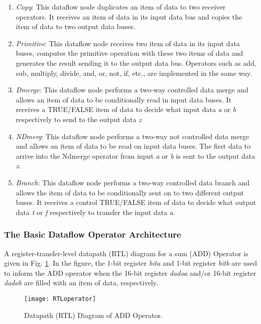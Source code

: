\documentclass[preprint,12pt]{elsarticle}
\begin{document}
\begin{enumerate}
  \item {\it Copy}: This dataflow node duplicates an item of data to two receiver operators. It receives an item of data in its input data bus and copies the item of data to two output data buses.
  \item {\it Primitive}: This dataflow node receives two item of data in its input data buses, computes the primitive operation with these two items of data and generates the result sending it to the output data bus. Operators such as add, sub, multiply, divide, and, or, not, if, etc., are implemented in the same way.
  \item {\it Dmerge}: This dataflow node performs a two-way controlled data merge and allows an item of data to be conditionally read in input data buses. It receives a TRUE/FALSE item of data to decide what input data {\it a} or {\it b} respectively to send to the output data {\it z}
  \item {\it NDmerg}: This dataflow node performs a two-way not controlled data merge and allows an item of data to be read on input data buses. The first data to arrive into the Ndmerge operator from input {\it a} or {\it b} is sent to the output data {\it z}.
  \item {\it Branch}: This dataflow node performs a two-way controlled data branch and allows the item of data to be conditionally sent on to two different output buses. It receives a control TRUE/FALSE item of data to decide what output data {\it t} or {\it f} respectively to transfer the input data {\it a}.
\end{enumerate}





\subsubsection{The Basic Dataflow Operator Architecture}

A register-transfer-level datapath (RTL) diagram for a sum (ADD) Operator is given in Fig. \ref{f5}. In the figure, the 1-bit register {\it bita} and  1-bit register {\it bitb} are  used to inform the ADD operator when the 16-bit register {\it dadoa} and/or 16-bit register {\it dadob} are filled with an item of data, respectively.

 \begin{figure}[h]
\begin{center}
   \texttt{[image: RTLoperator]}
   \caption{Datapath (RTL) Diagram of ADD Operator.} \label{f5}
\end{center}
\end{figure}
\end{document}
